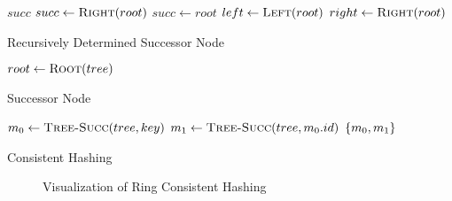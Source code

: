 \begin{algorithm}
    \begin{algorithmic}
                \State \Return $succ$
                \State $succ \gets \Call{Right}{root}$
                    \State $succ \gets root$
                    \EndWhile
                \Else
                    \EndWhile
                \EndIf
                \State $left \gets \Call{Left}{root}$
                \State \Return {}
            \Else
                \State $right \gets \Call{Right}{root}$
                \State \Return {}
            \EndIf
        \EndProcedure
    \end{algorithmic}
    \caption{Recursively Determined Successor Node}
    \label{alg:recur-succ}
\end{algorithm}
%
\begin{algorithm}
    \begin{algorithmic}
                \State \Return {}
            \Else
                \State $root \gets \Call{Root}{tree}$
                \State \Return {}
            \EndIf
        \EndProcedure
    \end{algorithmic}
    \caption{Successor Node \cite{bstPredecessorSuccessor}}
    \label{alg:tree-succ}
\end{algorithm}
%
\begin{algorithm}
    \begin{algorithmic}
            \State $m_0 \gets \Call{Tree-Succ}{tree, key}$
            \State $m_1 \gets \Call{Tree-Succ}{tree, m_0.id}$
            \State \Return $\left\{m_0, m_1\right\}$
        \EndProcedure
    \end{algorithmic}
    \caption{Consistent Hashing}
    \label{alg:consistent-hashing}
\end{algorithm}
%
\begin{figure}
    \centering
    
    \caption{Visualization of Ring Consistent Hashing}
    \label{fig:ring-hash-process}
\end{figure}
%
